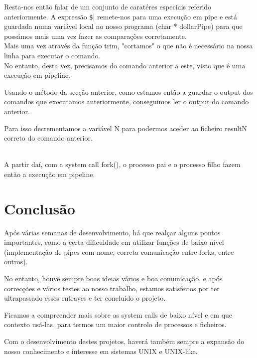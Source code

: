 \documentclass[11pt,a4paper]{report}
\begin{document}
Resta-nos então falar de um conjunto de caratéres especiais referido anteriormente. A expressão \verb|$|| remete-nos para uma execução em pipe e está guardada numa variável local no nosso programa (char * dollarPipe) para que possámos mais uma vez fazer as comparações corretamente.
~\\
 

Mais uma vez através da função trim, "cortamos" o que não é necessário na nossa linha para executar o comando.
 ~\\

No entanto, desta vez, precisamos do comando anterior a este, visto que é uma execução em pipeline.

Usando o método da secção anterior, como estamos então a guardar o output dos comandos que executamos anteriormente, conseguimos ler o output do comando anterior.

Para isso decrementamos a variável N para podermos aceder ao ficheiro resultN correto do comando anterior.
 
~\\

A partir daí, com a system call fork(), o processo pai e o processo filho fazem então a execução em pipeline.





\chapter{Conclusão}

Após várias semanas de desenvolvimento, há que realçar alguns pontos importantes, como a certa dificuldade em utilizar funções de baixo nível (implementação de pipes com nome, correta comunicação entre forks, entre outros). 

No entanto, houve sempre boas ideias vários e boa comunicação, e após correcções e vários testes ao nosso trabalho, estamos satisfeitos por ter ultrapassado esses entraves e ter concluído o projeto.

Ficamos a compreender mais sobre as system calls de baixo nível e em que contexto usá-las, para termos um maior controlo de processos e ficheiros. 

Com o desenvolvimento destes projetos, haverá também sempre a expansão do nosso conhecimento e interesse em sistemas UNIX e UNIX-like.
\end{document}
